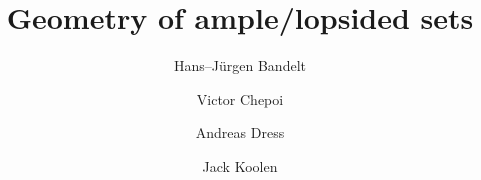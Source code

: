 \documentclass[11pt,a4paper]{amsart}
\theoremstyle{definition}
\numberwithin{equation}{section}
\begin{document}
\thispagestyle{empty}

\title{Geometry of ample/lopsided sets}

\author{Hans--J\"urgen Bandelt}
\address{Fachbereich Mathematik, Universit\"at   Hamburg, Bundesstr. 55, D-20146 Hamburg, Germany}

\author{Victor Chepoi}
\address{Laboratoire d'Informatique et des Syst\`emes, Universit\'e d'Aix-Marseille, Facult\'e des Sciences de Luminy, F-13288 Marseille Cedex 9, France}

\author{Andreas Dress}

\author{Jack Koolen}
\address{University of Science and Technology of China, China}
\end{document}

